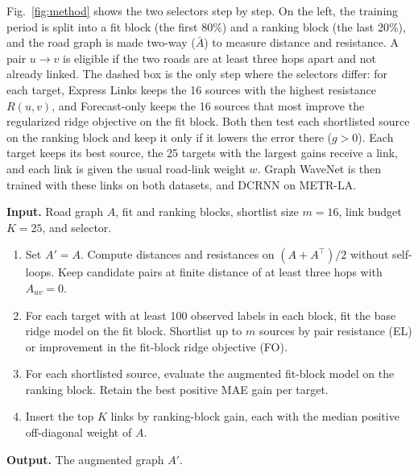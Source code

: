 \documentclass[journal]{IEEEtran}
\begin{document}
Fig.~\ref{fig:method} shows the two selectors step by step. On the left, the training period is split into a fit block (the first 80\%) and a ranking block (the last 20\%), and the road graph is made two-way ($\bar A$) to measure distance and resistance. A pair $u\to v$ is eligible if the two roads are at least three hops apart and not already linked. The dashed box is the only step where the selectors differ: for each target, Express Links keeps the 16 sources with the highest resistance $R(u,v)$, and Forecast-only keeps the 16 sources that most improve the regularized ridge objective on the fit block. Both then test each shortlisted source on the ranking block and keep it only if it lowers the error there ($g>0$). Each target keeps its best source, the 25 targets with the largest gains receive a link, and each link is given the usual road-link weight $w$. Graph WaveNet is then trained with these links on both datasets, and DCRNN on METR-LA.

\begin{algorithm}[!t]
\caption{Ridge-based selectors: Express Links (EL) and Forecast-only (FO)}
\label{alg:ridge}
\small
\textbf{Input.} Road graph $A$, fit and ranking blocks, shortlist size $m=16$, link budget $K=25$, and selector.\par
\begin{enumerate}\setlength{\itemsep}{1pt}
\item Set $A'=A$. Compute distances and resistances on $(A+A^\top)/2$ without self-loops. Keep candidate pairs at finite distance of at least three hops with $A_{uv}=0$.
\item For each target with at least 100 observed labels in each block, fit the base ridge model on the fit block. Shortlist up to $m$ sources by pair resistance (EL) or improvement in the fit-block ridge objective (FO).
\item For each shortlisted source, evaluate the augmented fit-block model on the ranking block. Retain the best positive MAE gain per target.
\item Insert the top $K$ links by ranking-block gain, each with the median positive off-diagonal weight of $A$.
\end{enumerate}
\textbf{Output.} The augmented graph $A'$.
\end{algorithm}
\end{document}
